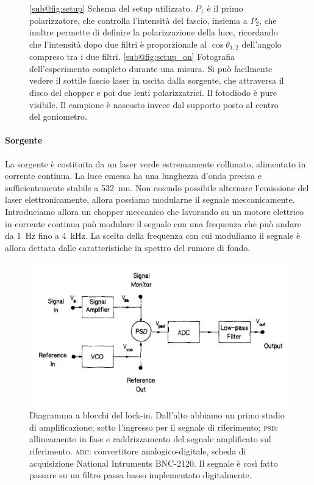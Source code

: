 \documentclass[
    prb,altaffilletter,citeautoscript,
    amsmath,amssymb,
    showpacs,showkeys,floatfix,
    reprint
]{revtex4-1}
\begin{document}
\begin{figure}
    \centering
    \caption{\ref{sub@fig:setup} Schema del setup utilizzato. $P_1$ è il primo polarizzatore, che controlla l'intensità del fascio, insiema a $P_2$, che inoltre permette di definire la polarizzazione della luce, ricordando che l'intensità dopo due filtri è proporzionale al $\cos\theta_{1,2}$ dell'angolo compreso tra i due filtri. \ref{sub@fig:setup_on} Fotografia dell'esperimento completo durante una misura. Si può facilmente vedere il sottile fascio laser in uscita dalla sorgente, che attraversa il disco del chopper e poi due lenti polarizzatrici. Il fotodiodo è pure visibile. Il campione è nascosto invece dal supporto posto al centro del goniometro. }
    \label{fig:setup_and_photo}
\end{figure}

\paragraph*{Sorgente} La sorgente è costituita da un laser verde estremamente collimato, alimentato in corrente continua. La luce emessa ha una lunghezza d'onda precisa e sufficientemente stabile a \SI{532}{\nano\metre}. Non essendo possibile alternare l'emissione del laser elettronicamente, allora possiamo modularne il segnale meccanicamente. Introduciamo allora un chopper meccanico che lavorando su un motore elettrico in corrente continua può modulare il segnale con una frequenza che può andare da \SI{1}{\hertz} fino a \SI{4}{\kilo\hertz}. La scelta della frequenza con cui moduliamo il segnale è allora dettata dalle caratteristiche in spettro del rumore di fondo. 

\begin{figure}
    \centering
    \includegraphics[width=\linewidth]{figures/block_diagram.png}
    \caption{Diagramma a blocchi del lock-in. Dall'alto abbiamo un primo stadio di amplificazione; sotto l'ingresso per il segnale di riferimento; \textsc{psd}: allineamento in fase e raddrizzamento del segnale amplificato sul riferimento. \textsc{adc}: convertitore analogico-digitale, scheda di acquisizione National Intruments BNC-2120. Il segnale è così fatto passare su un filtro passa basso implementato digitalmente. }
    \label{fig:lock-in/block_diagram}
\end{figure}
\end{document}
